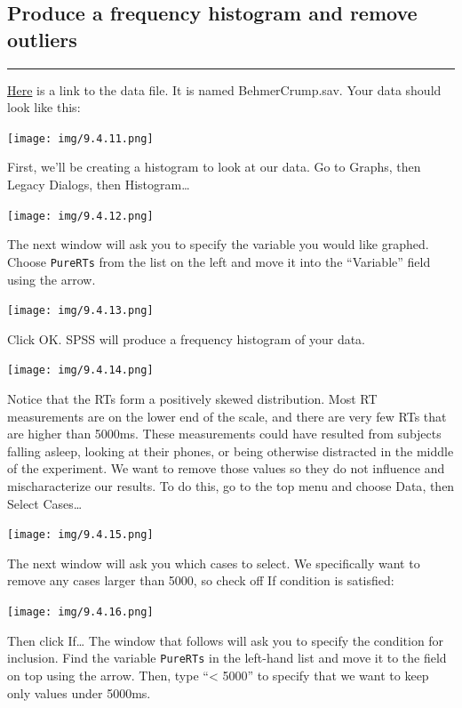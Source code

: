 \documentclass[]{book}
\begin{document}
\subsection{Produce a frequency histogram and remove
outliers}\label{produce-a-frequency-histogram-and-remove-outliers}

\begin{center}\rule{0.5\linewidth}{0.5pt}\end{center}

\href{https://github.com/CrumpLab/statisticsLab/blob/master/data/spssdata/BehmerCrump.sav}{Here}
is a link to the data file. It is named BehmerCrump.sav. Your data
should look like this:

\texttt{[image: img/9.4.11.png]}

First, we'll be creating a histogram to look at our data. Go to
{Graphs}, then {Legacy Dialogs}, then {Histogram\ldots{}}

\texttt{[image: img/9.4.12.png]}

The next window will ask you to specify the variable you would like
graphed. Choose \texttt{PureRTs} from the list on the left and move it
into the ``Variable'' field using the arrow.

\texttt{[image: img/9.4.13.png]}

Click {OK}. SPSS will produce a frequency histogram of your data.

\texttt{[image: img/9.4.14.png]}

Notice that the RTs form a positively skewed distribution. Most RT
measurements are on the lower end of the scale, and there are very few
RTs that are higher than 5000ms. These measurements could have resulted
from subjects falling asleep, looking at their phones, or being
otherwise distracted in the middle of the experiment. We want to remove
those values so they do not influence and mischaracterize our results.
To do this, go to the top menu and choose {Data}, then {Select
Cases\ldots{}}

\texttt{[image: img/9.4.15.png]}

The next window will ask you which cases to select. We specifically want
to remove any cases larger than 5000, so check off {If condition is
satisfied:}

\texttt{[image: img/9.4.16.png]}

Then click {If\ldots{}} The window that follows will ask you to specify
the condition for inclusion. Find the variable \texttt{PureRTs} in the
left-hand list and move it to the field on top using the arrow. Then,
type ``\textless{} 5000'' to specify that we want to keep only values
under 5000ms.
\end{document}
